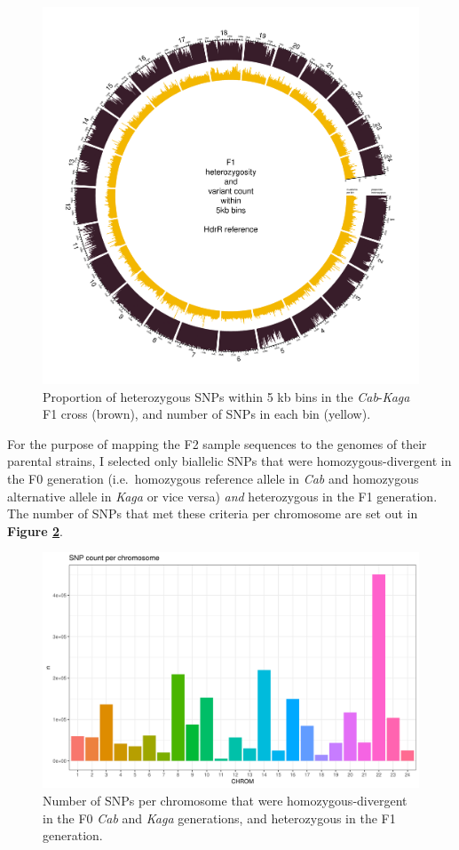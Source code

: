 \documentclass[
]{book}
\begin{document}
\begin{figure}
\includegraphics[width=1\linewidth]{figs/somites/F1} \caption{Proportion of heterozygous SNPs within 5 kb bins in the \emph{Cab}-\emph{Kaga} F1 cross (brown), and number of SNPs in each bin (yellow).}\label{fig:somite-f1}
\end{figure}

For the purpose of mapping the F2 sample sequences to the genomes of their parental strains, I selected only biallelic SNPs that were homozygous-divergent in the F0 generation (i.e.~homozygous reference allele in \emph{Cab} and homozygous alternative allele in \emph{Kaga} or vice versa) \emph{and} heterozygous in the F1 generation. The number of SNPs that met these criteria per chromosome are set out in \textbf{Figure \ref{fig:snp-counts-per-chrom}}.



\begin{figure}
\includegraphics[width=1\linewidth]{figs/somites/snp_counts_per_chrom} \caption{Number of SNPs per chromosome that were homozygous-divergent in the F0 \emph{Cab} and \emph{Kaga} generations, and heterozygous in the F1 generation.}\label{fig:snp-counts-per-chrom}
\end{figure}
\end{document}
